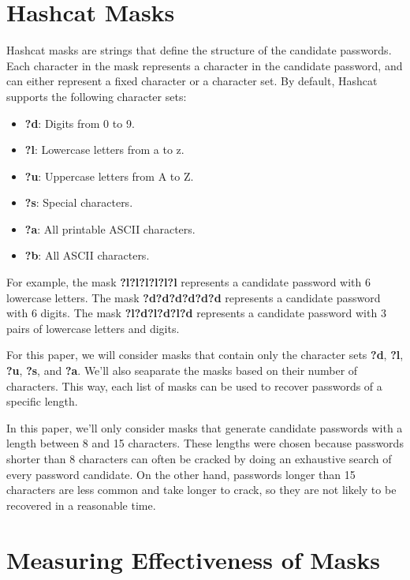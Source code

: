 \documentclass[sigconf,authordraft]{acmart}
\begin{document}
\section{Hashcat Masks}
\label{sec:hashcat_masks}

Hashcat masks are strings that define the structure of the candidate passwords.
Each character in the mask represents a character in the candidate password, and can either represent a fixed character or a character set.
By default, Hashcat supports the following character sets:

\begin{itemize}
  \item \textbf{?d}: Digits from 0 to 9.
  \item \textbf{?l}: Lowercase letters from a to z.
  \item \textbf{?u}: Uppercase letters from A to Z.
  \item \textbf{?s}: Special characters.
  \item \textbf{?a}: All printable ASCII characters.
  \item \textbf{?b}: All ASCII characters.
\end{itemize}

For example, the mask \textbf{?l?l?l?l?l?l} represents a candidate password with 6 lowercase letters.
The mask \textbf{?d?d?d?d?d?d} represents a candidate password with 6 digits.
The mask \textbf{?l?d?l?d?l?d} represents a candidate password with 3 pairs of lowercase letters and digits.

For this paper, we will consider masks that contain only the character sets \textbf{?d}, \textbf{?l}, \textbf{?u}, \textbf{?s}, and \textbf{?a}.
We'll also seaparate the masks based on their number of characters.
This way, each list of masks can be used to recover passwords of a specific length.

In this paper, we'll only consider masks that generate candidate passwords with a length between 8 and 15 characters.
These lengths were chosen because passwords shorter than 8 characters can often be cracked by doing an exhaustive search of every password candidate.
On the other hand, passwords longer than 15 characters are less common and take longer to crack, so they are not likely to be recovered in a reasonable time.

\section{Measuring Effectiveness of Masks}
\end{document}
